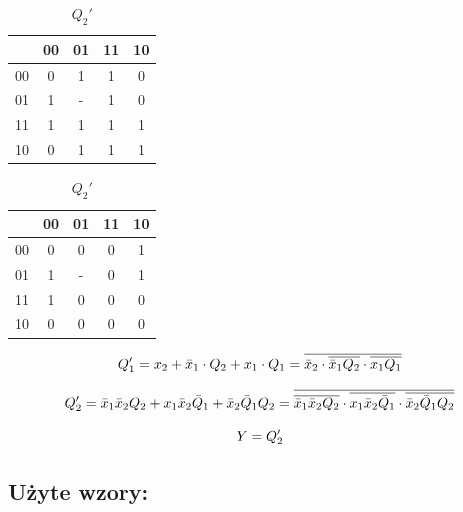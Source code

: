 \documentclass[12pt,a4paper]{article}
\begin{document}
			
			\begin{table}[H]
				\begin{minipage}{.5\textwidth}
					\centering
					\begin{tabular}{c|c|c|c|c}
						\backslashbox{$Q_1Q_2$}{$x_1x_2$}	&	00	&	01	&	11	&	10	\\\hline
						00	&	0	&	1	&	1	&	0	\\\hline
						01	&	1	&	-	&	1 	&	0	\\\hline
						11	&	1	&	1	&	1	&	1 	\\\hline
						10	&	0	&	1	&	1	&	1 	\\
					\end{tabular}
					\caption{$Q_1'$}
				\end{minipage}%
				\begin{minipage}{.5\textwidth}
					\centering
					\begin{tabular}{c|c|c|c|c}
						\backslashbox{$Q_1Q_2$}{$x_1x_2$}	&	00	&	01	&	11	&	10	\\\hline
						00	&	0	&	0	&	0	&	1	\\\hline
						01	&	1	&	-	&	0 	&	1	\\\hline
						11	&	1	&	0	&	0	&	0 	\\\hline
						10	&	0	&	0	&	0	&	0 	\\
					\end{tabular}
					\caption{$Q_2'$}
				\end{minipage}
			\end{table}	
		
			\begin{equation}
				\centering
				Q_1' = x_2 + \bar{x}_1 \cdot Q_2 + x_1 \cdot Q_1 = 
				\overline{\bar{x}_2 \cdot \overline{\bar{x}_1 Q_2} \cdot \overline{x_1 Q_1}}
			\end{equation}
			
			\begin{equation}
				\centering
				Q_2' = \bar{x}_1\bar{x}_2Q_2 + x_1\bar{x}_2\bar{Q}_1 + \bar{x}_2\bar{Q}_1Q_2 =
				\overline{\overline{\bar{x}_1\bar{x}_2Q_2} \cdot \overline{x_1\bar{x}_2\bar{Q}_1} \cdot 	\overline{\bar{x}_2\bar{Q}_1Q_2}}
			\end{equation}
			
			\begin{equation}
				\centering
				Y = Q_2'			
			\end{equation}
		
		\subsection{Użyte wzory:}
		
\end{document}
